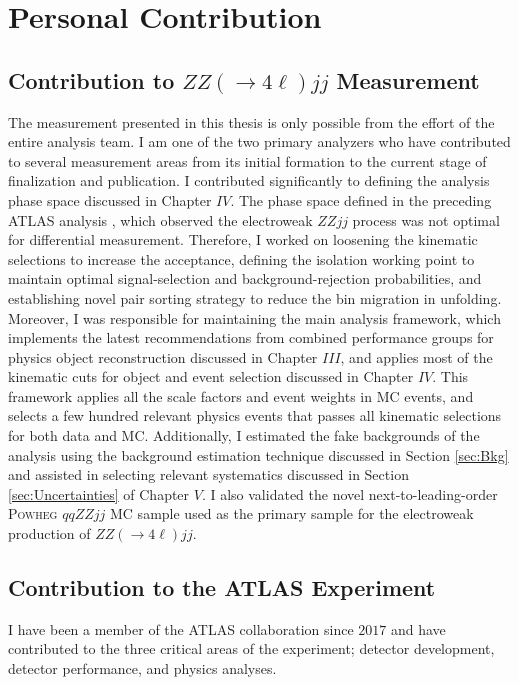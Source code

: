 \section{Personal Contribution}
\label{Appendix:Contribution}

\subsection{Contribution to $ZZ(\rightarrow 4\ell)jj$ Measurement} 
\label{subsec:ZZjjContr}

The measurement presented in this thesis is only possible from the effort of the entire analysis team. I am one of the two primary analyzers who have contributed to several measurement areas from its initial formation to the current stage of finalization and publication. I contributed significantly to defining the analysis phase space discussed in Chapter $IV$. The phase space defined in the preceding ATLAS analysis \cite{ATLASZZjj}, which observed the electroweak $ZZjj$ process was not optimal for differential measurement. Therefore, I worked on loosening the kinematic selections to increase the acceptance, defining the isolation working point to maintain optimal signal-selection and background-rejection probabilities, and establishing novel pair sorting strategy to reduce the bin migration in unfolding. Moreover, I was responsible for maintaining the main analysis framework, which implements the latest recommendations from combined performance groups for physics object reconstruction discussed in Chapter $III$, and applies most of the kinematic cuts for object and event selection discussed in Chapter $IV$. This framework applies all the scale factors and event weights in MC events, and selects a few hundred relevant physics events that passes all kinematic selections for both data and MC. Additionally, I estimated the fake backgrounds of the analysis using the background estimation technique discussed in Section \ref{sec:Bkg} and assisted in selecting relevant systematics discussed in Section \ref{sec:Uncertainties} of Chapter $V$. I also validated the novel next-to-leading-order \textsc{Powheg} $qqZZjj$ MC sample used as the primary sample for the electroweak production of $ZZ(\rightarrow 4\ell)jj$. 

\subsection{Contribution to the ATLAS Experiment}
\label{subsec:ATLASContr}
I have been a member of the ATLAS collaboration since $2017$ and have contributed to the three critical areas of the experiment; detector development, detector performance, and physics analyses.


